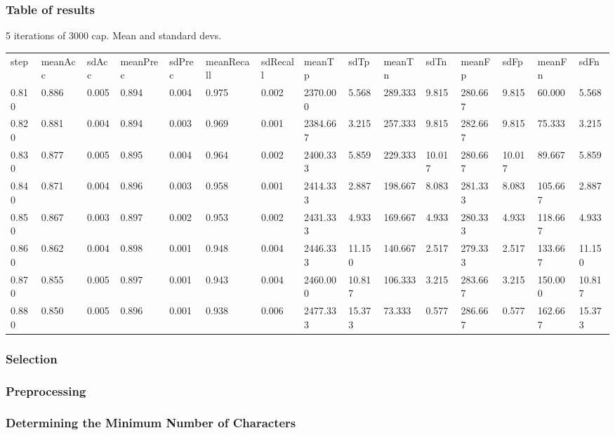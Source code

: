 \documentclass[10pt]{article}
\begin{document}
\subsubsection{Table of results}
\label{sec-2-2-1}

5 iterations of 3000 cap. Mean and standard devs.
\begin{tabular}{lllllllllllllll}
step & meanAcc & sdAcc & meanPrec & sdPrec & meanRecall & sdRecall & meanTp & sdTp & meanTn & sdTn & meanFp & sdFp & meanFn & sdFn \\
0.810 & 0.886 & 0.005 & 0.894 & 0.004 & 0.975 & 0.002 & 2370.000 & 5.568 & 289.333 & 9.815 & 280.667 & 9.815 & 60.000 & 5.568 \\
0.820 & 0.881 & 0.004 & 0.894 & 0.003 & 0.969 & 0.001 & 2384.667 & 3.215 & 257.333 & 9.815 & 282.667 & 9.815 & 75.333 & 3.215 \\
0.830 & 0.877 & 0.005 & 0.895 & 0.004 & 0.964 & 0.002 & 2400.333 & 5.859 & 229.333 & 10.017 & 280.667 & 10.017 & 89.667 & 5.859 \\
0.840 & 0.871 & 0.004 & 0.896 & 0.003 & 0.958 & 0.001 & 2414.333 & 2.887 & 198.667 & 8.083 & 281.333 & 8.083 & 105.667 & 2.887 \\
0.850 & 0.867 & 0.003 & 0.897 & 0.002 & 0.953 & 0.002 & 2431.333 & 4.933 & 169.667 & 4.933 & 280.333 & 4.933 & 118.667 & 4.933 \\
0.860 & 0.862 & 0.004 & 0.898 & 0.001 & 0.948 & 0.004 & 2446.333 & 11.150 & 140.667 & 2.517 & 279.333 & 2.517 & 133.667 & 11.150 \\
0.870 & 0.855 & 0.005 & 0.897 & 0.001 & 0.943 & 0.004 & 2460.000 & 10.817 & 106.333 & 3.215 & 283.667 & 3.215 & 150.000 & 10.817 \\
0.880 & 0.850 & 0.005 & 0.896 & 0.001 & 0.938 & 0.006 & 2477.333 & 15.373 & 73.333 & 0.577 & 286.667 & 0.577 & 162.667 & 15.373
\end{tabular}
\subsubsection{Selection}
\label{sec-2-2-2}
\subsubsection{Preprocessing}
\label{sec-2-2-3}
\subsubsection{Determining the Minimum Number of Characters}
\label{sec-2-2-4}
\end{document}
